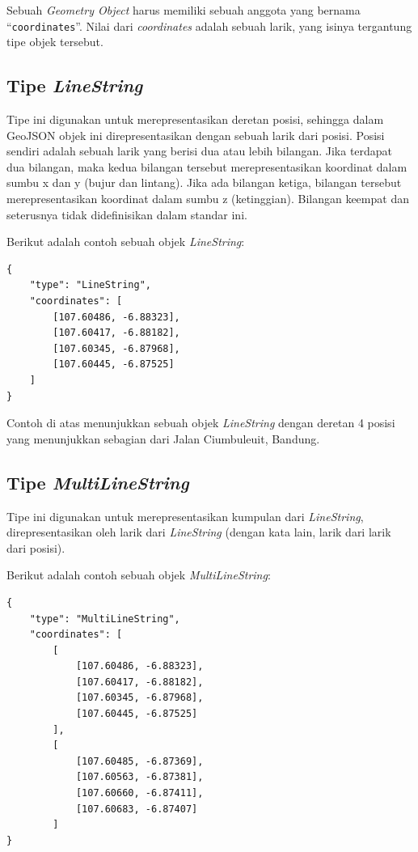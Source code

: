 Sebuah \textit{Geometry Object} harus memiliki sebuah anggota yang bernama ``\texttt{coordinates}''. Nilai dari \textit{coordinates} adalah sebuah larik, yang isinya tergantung tipe objek tersebut.

\subsection{Tipe \textit{LineString}}

Tipe ini digunakan untuk merepresentasikan deretan posisi, sehingga dalam GeoJSON objek ini direpresentasikan dengan sebuah larik dari posisi. Posisi sendiri adalah sebuah larik yang berisi dua atau lebih bilangan. Jika terdapat dua bilangan, maka kedua bilangan tersebut merepresentasikan koordinat dalam sumbu x dan y (bujur dan lintang). Jika ada bilangan ketiga, bilangan tersebut merepresentasikan koordinat dalam sumbu z (ketinggian). Bilangan keempat dan seterusnya tidak didefinisikan dalam standar ini.

Berikut adalah contoh sebuah objek \textit{LineString}:

\begin{lstlisting}
{
	"type": "LineString",
	"coordinates": [
		[107.60486, -6.88323],
		[107.60417, -6.88182],
		[107.60345, -6.87968],
		[107.60445, -6.87525]
	]
}
\end{lstlisting}

Contoh di atas menunjukkan sebuah objek \textit{LineString} dengan deretan 4 posisi yang menunjukkan sebagian dari Jalan Ciumbuleuit, Bandung.

\subsection{Tipe \textit{MultiLineString}}

Tipe ini digunakan untuk merepresentasikan kumpulan dari \textit{LineString}, direpresentasikan oleh larik dari \textit{LineString} (dengan kata lain, larik dari larik dari posisi).

Berikut adalah contoh sebuah objek \textit{MultiLineString}:

\begin{lstlisting}
{
	"type": "MultiLineString",
	"coordinates": [
		[
			[107.60486, -6.88323],
			[107.60417, -6.88182],
			[107.60345, -6.87968],
			[107.60445, -6.87525]
		],
		[
			[107.60485, -6.87369],
			[107.60563, -6.87381],
			[107.60660, -6.87411],
			[107.60683, -6.87407]
		]
}
\end{lstlisting}

